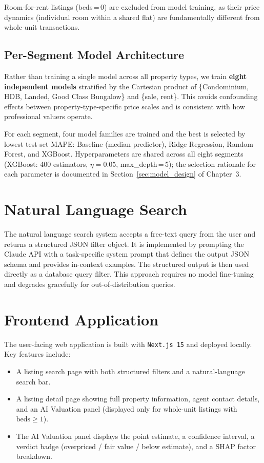 Room-for-rent listings (beds\,=\,0) are excluded from model training, as their price
dynamics (individual room within a shared flat) are fundamentally different from
whole-unit transactions.

\subsection{Per-Segment Model Architecture}

Rather than training a single model across all property types, we train \textbf{eight
independent models} stratified by the Cartesian product of \{Condominium, HDB, Landed,
Good Class Bungalow\} and \{sale, rent\}. This avoids confounding effects between
property-type-specific price scales and is consistent with how professional valuers
operate.

For each segment, four model families are trained and the best is selected by lowest
test-set MAPE: Baseline (median predictor), Ridge Regression, Random Forest, and
XGBoost. Hyperparameters are shared across all eight segments (XGBoost: 400 estimators,
$\eta=0.05$, max\_depth\,=\,5); the selection rationale for each parameter is documented
in Section~\ref{sec:model_design} of Chapter~3.

\section{Natural Language Search}

The natural language search system accepts a free-text query from the user and returns
a structured JSON filter object. It is implemented by prompting the Claude
API with a task-specific system prompt that defines the output JSON schema and
provides in-context examples. The structured output is then used directly as a
database query filter. This approach requires no model fine-tuning and degrades
gracefully for out-of-distribution queries.

\section{Frontend Application}

The user-facing web application is built with \texttt{Next.js 15} and 
deployed locally. Key features include:
\begin{itemize}
    \item A listing search page with both structured filters and a natural-language search bar.
    \item A listing detail page showing full property information, agent contact details, and an AI Valuation panel (displayed only for whole-unit listings with $\text{beds} \geq 1$).
    \item The AI Valuation panel displays the point estimate, a confidence interval, a verdict badge (overpriced / fair value / below estimate), and a SHAP factor breakdown.
\end{itemize}

